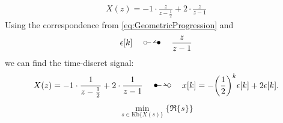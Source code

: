 \begin{align}
	X(z)=-1\cdot\frac{z}{z-\frac{1}{2}}+2\cdot\frac{z}{z-1}
\end{align}
Using the correspondence from \ref{eq:GeometricProgression} and 
\begin{align}
	\epsilon[k]\quad\ztransf\quad\frac{z}{z-1}
\end{align}
we can find the time-discret signal:
\begin{align}
	X(z)=-1\cdot\frac{1}{z-\frac{1}{2}}+2\cdot\frac{1}{z-1}\quad\Ztransf\quad x[k]=-\bigg(\frac{1}{2}\bigg)^k\epsilon[k]+2\epsilon[k].
\end{align}
\begin{align}
	\underset{s \in \mathrm{Kb} \{ X(s) \} }{\min}\big \{ \Re \{ s \} \big \}
\end{align}